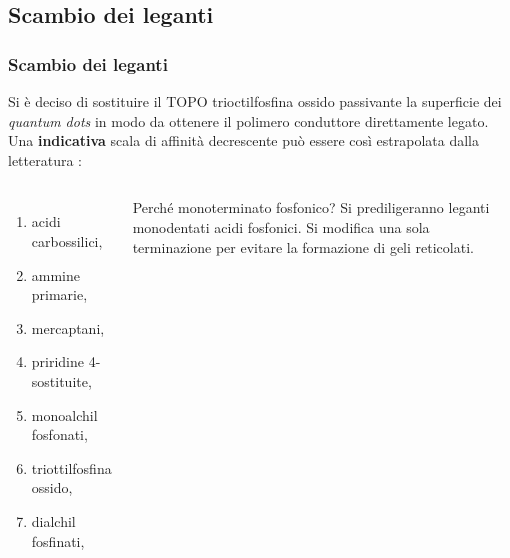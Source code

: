 \documentclass{beamer}
\begin{document}
  \subsection{Scambio dei leganti}
    \begin{frame}
      \frametitle{
Scambio dei leganti}
      Si è deciso di sostituire il TOPO trioctilfosfina ossido passivante la superficie dei \emph{quantum dots} in modo da ottenere il polimero conduttore direttamente legato. 
 \pause     \\Una \alert{\bf{indicativa} }scala di affinità decrescente può essere così estrapolata dalla letteratura\citep{lig-CdSe-caratt} \citep{lig-CdSe-P} \citep{fv-CdSe-OA}:
      \begin{columns}
	\begin{enumerate}
	 \item acidi carbossilici,
	 \item ammine primarie,
	 \item mercaptani,
	 \item priridine 4-sostituite,
	 \item monoalchil fosfonati,
	 \item triottilfosfina ossido,
	 \item dialchil fosfinati,
	\end{enumerate}
	\begin{block}{Perché monoterminato fosfonico?}
	    Si prediligeranno leganti monodentati acidi fosfonici. Si modifica una sola terminazione per evitare la formazione di geli reticolati.
	\end{block}
      \end{columns}
    \end{frame}

  
\end{document}
